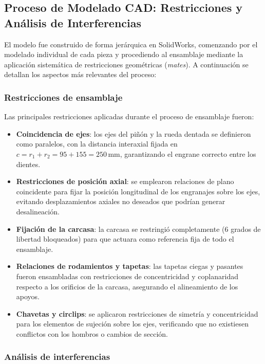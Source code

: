 \documentclass[conference]{IEEEtran}
\begin{document}
\subsection{Proceso de Modelado CAD: Restricciones y Análisis de Interferencias}

El modelo fue construido de forma jerárquica en SolidWorks, comenzando por el modelado
individual de cada pieza y procediendo al ensamblaje mediante la aplicación sistemática de
restricciones geométricas (\textit{mates}). A continuación se detallan los aspectos más
relevantes del proceso:

\subsubsection{Restricciones de ensamblaje}

Las principales restricciones aplicadas durante el proceso de ensamblaje fueron:

\begin{itemize}
  \item \textbf{Coincidencia de ejes}: los ejes del piñón y la rueda dentada se definieron
  como paralelos, con la distancia interaxial fijada en $c = r_1 + r_2 = 95 + 155 =
  250$\,mm, garantizando el engrane correcto entre los dientes.
  \item \textbf{Restricciones de posición axial}: se emplearon relaciones de plano
  coincidente para fijar la posición longitudinal de los engranajes sobre los ejes,
  evitando desplazamientos axiales no deseados que podrían generar desalineación.
  \item \textbf{Fijación de la carcasa}: la carcasa se restringió completamente (6 grados
  de libertad bloqueados) para que actuara como referencia fija de todo el ensamblaje.
  \item \textbf{Relaciones de rodamientos y tapetas}: las tapetas ciegas y pasantes fueron
  ensambladas con restricciones de concentricidad y coplanaridad respecto a los orificios
  de la carcasa, asegurando el alineamiento de los apoyos.
  \item \textbf{Chavetas y circlips}: se aplicaron restricciones de simetría y
  concentricidad para los elementos de sujeción sobre los ejes, verificando que no
  existiesen conflictos con los hombros o cambios de sección.
\end{itemize}

\subsubsection{Análisis de interferencias}
\end{document}
